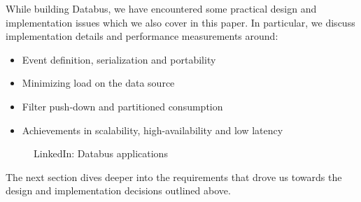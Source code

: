 While building Databus, we have encountered some practical design and implementation issues which we also cover in this paper. 
In particular, we discuss implementation details and performance measurements around:
\begin{itemize}
\item{Event definition, serialization and portability}
\item{Minimizing load on the data source}
\item{Filter push-down and partitioned consumption}
\item{Achievements in scalability, high-availability and low latency}
\end{itemize}

\begin{figure}
\centering
{}
\caption{LinkedIn: Databus applications}
\label{fig:databus-use-cases}
\end{figure}

The next section dives deeper into the requirements that drove us towards the design and implementation decisions outlined above. 



